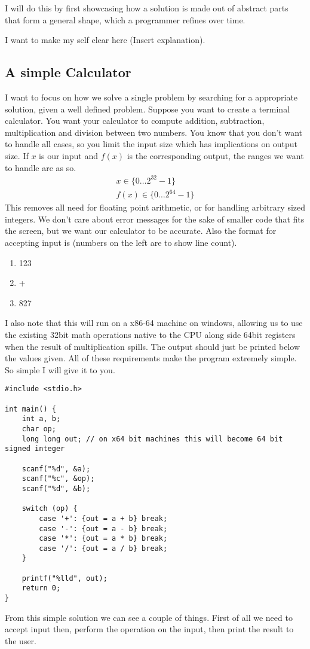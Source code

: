 \documentclass[a4paper]{article}
\begin{document}
I will do this by first showcasing how a solution is made out of abstract parts that form 
a general shape, which a programmer refines over time.

I want to make my self clear here (Insert explanation).  

\subsection{A simple Calculator}

I want to focus on how we solve a single problem by searching for a appropriate solution, 
given a well defined problem. Suppose you want to create a terminal calculator. You want 
your calculator to compute addition, subtraction, multiplication and division between two 
numbers. You know that you don't want to handle all cases, so you limit the input size 
which has implications on output size. If $x$ is our input and $f(x)$ is the corresponding 
output, the ranges we want to handle are as so. 
\begin{align*}
    x \in \{0 \dots 2^{32}-1\} \\
    f(x) \in \{0 \dots 2^{64}-1\}
\end{align*}
This removes all need for floating point arithmetic, or for handling arbitrary sized integers.
We don't care about error messages for the sake of smaller code that fits the screen, but we 
want our calculator to be accurate. Also the format for accepting input is (numbers on the 
left are to show line count).
\begin{enumerate}
    \item 123
    \item +
    \item 827
\end{enumerate} 
I also note that this will run on a x86-64 machine on windows, allowing us to use the 
existing 32bit math operations native to the CPU along side 64bit registers when the 
result of multiplication spills. The output should just be printed below the values given.
All of these requirements make the program extremely simple. So simple I will give it to you.
\pagebreak
\begin{lstlisting}
#include <stdio.h>

int main() { 
    int a, b;
    char op; 
    long long out; // on x64 bit machines this will become 64 bit signed integer

    scanf("%d", &a);
    scanf("%c", &op);
    scanf("%d", &b);
    
    switch (op) {
        case '+': {out = a + b} break;
        case '-': {out = a - b} break;
        case '*': {out = a * b} break;
        case '/': {out = a / b} break;
    }

    printf("%lld", out);
    return 0;
}
\end{lstlisting}
From this simple solution we can see a couple of things. First of all we need to accept input
then, perform the operation on the input, then print the result to the user. 
\end{document}

